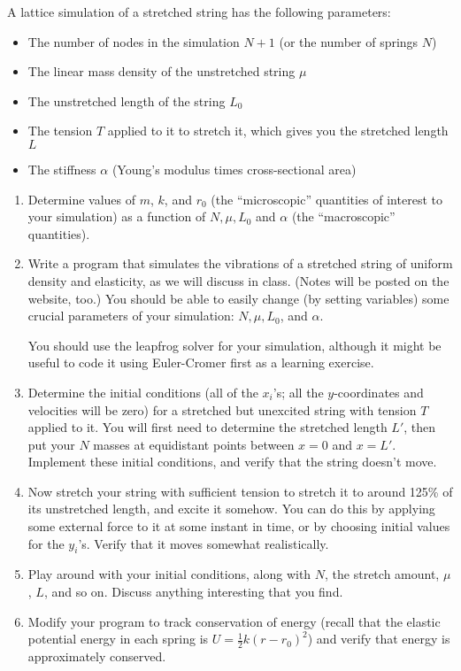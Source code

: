\documentclass[12pt]{article}
\begin{document}
  
  A lattice simulation of a stretched string has the following parameters:
    \begin{itemize}
      \item{The number of nodes in the simulation $N+1$ (or the number of springs $N$)}
        \item{The linear mass density of the unstretched string $\mu$}
        \item{The unstretched length of the string $L_0$}
        \item{The tension $T$ applied to it to stretch it, which gives you the stretched length $L$}
        \item{The stiffness $\alpha$ (Young's modulus times cross-sectional area)}
      \end{itemize}

\begin{enumerate}

  \item{Determine values of $m$, $k$, and $r_0$ (the ``microscopic'' quantities of interest to your simulation) as a function of $N, \mu, L_0$ and $\alpha$ (the ``macroscopic'' quantities).}

  \item{Write a program that simulates the vibrations of a stretched string of uniform density and elasticity, as we will discuss in class. (Notes will be posted on the website, too.)
      You should be able to easily change (by setting variables) some crucial parameters of your simulation: $N, \mu, L_0$, and $\alpha$.

      You should use the leapfrog solver for your simulation, although it might be useful to code it using Euler-Cromer first as a learning exercise.

    }

  \item{Determine the initial conditions (all of the $x_i$'s; all the $y$-coordinates and velocities will be zero) for a stretched but unexcited string with tension $T$ applied to it. You will first need to determine the stretched length $L'$, then put your $N$
    masses at equidistant points between $x=0$ and $x=L'$. Implement these initial conditions, and verify that the string doesn't move.} 

  \item{Now stretch your string with sufficient tension to stretch it to around 125\% of its unstretched length, and excite it somehow. You can do this by applying some external force to it at some instant in time, or by choosing initial values for the $y_i$'s.
    Verify that it moves somewhat realistically.}

  \item{Play around with your initial conditions, along with $N$, the stretch amount, $\mu$, $L$, and so on. Discuss anything interesting that you find.}

  \item{Modify your program to track conservation of energy (recall that the elastic potential energy in each spring is $U=\frac{1}{2}k(r-r_0)^2$) and verify that energy is approximately conserved.}
\end{enumerate}
\end{document}
